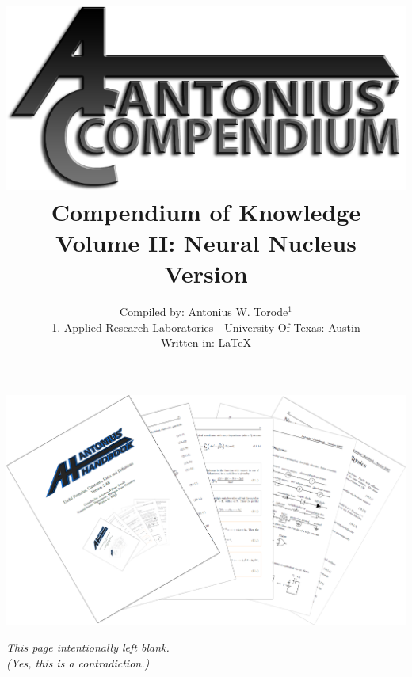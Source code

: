\documentclass[openany,twoside, notitlepage,letterpaper,11pt]{book}
\title{\includegraphics[scale=2.5]{./Images/Covers/AC.png}
	\\ Compendium of Knowledge \\ Volume II: Neural Nucleus \\ Version \Version}
\date{}
\author{Compiled by: Antonius W. Torode$^{1}$ \\ \scriptsize{1. Applied Research Laboratories - University Of Texas: Austin} \\ Written in: \LaTeX}
\begin{document}
\frontmatter
\maketitle
\thispagestyle{empty}
\pagestyle{empty}
\begin{center}	
	\includegraphics[scale=1.6]{./Images/Covers/background_tunnel.png}
\end{center}





\thispagestyle{empty}
\newpage
{}
\begin{center}
	\textit{This page intentionally left blank.\\ (Yes, this is a contradiction.)}
\end{center}

\tableofcontents


\setlength{\parindent}{0pt}
\mainmatter
\pagestyle{fancy}
%
\setlength{\parindent}{25pt}









\backmatter
%
\printindex
\end{document}
